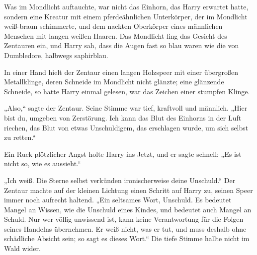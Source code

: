 Was im Mondlicht auftauchte, war nicht das Einhorn, das Harry erwartet hatte, sondern eine Kreatur mit einem pferdeähnlichen Unterkörper, der im Mondlicht weiß-braun schimmerte, und dem nackten Oberkörper eines männlichen Menschen mit langen weißen Haaren. Das Mondlicht fing das Gesicht des Zentauren ein, und Harry sah, dass die Augen fast so blau waren wie die von Dumbledore, halbwegs saphirblau.

In einer Hand hielt der Zentaur einen langen Holzspeer mit einer übergroßen Metallklinge, deren Schneide im Mondlicht nicht glänzte; eine glänzende Schneide, so hatte Harry einmal gelesen, war das Zeichen einer stumpfen Klinge.

„Also,“ sagte der Zentaur. Seine Stimme war tief, kraftvoll und männlich.
„Hier bist du, umgeben von Zerstörung. Ich kann das Blut des Einhorns in der Luft riechen, das Blut von etwas Unschuldigem, das erschlagen wurde, um sich selbst zu retten.“

Ein Ruck plötzlicher Angst holte Harry ins Jetzt, und er sagte schnell:
„Es ist nicht so, wie es aussieht.“

„Ich weiß. Die Sterne selbst verkünden ironischerweise deine Unschuld.“
Der Zentaur machte auf der kleinen Lichtung einen Schritt auf Harry zu, seinen Speer immer noch aufrecht haltend.
„Ein seltsames Wort, Unschuld. Es bedeutet Mangel an Wissen, wie die Unschuld eines Kindes, und bedeutet auch Mangel an Schuld. Nur wer völlig unwissend ist, kann keine Verantwortung für die Folgen seines Handelns übernehmen. Er weiß nicht, was er tut, und muss deshalb ohne schädliche Absicht sein; so sagt es dieses Wort.“
Die tiefe Stimme hallte nicht im Wald wider.

